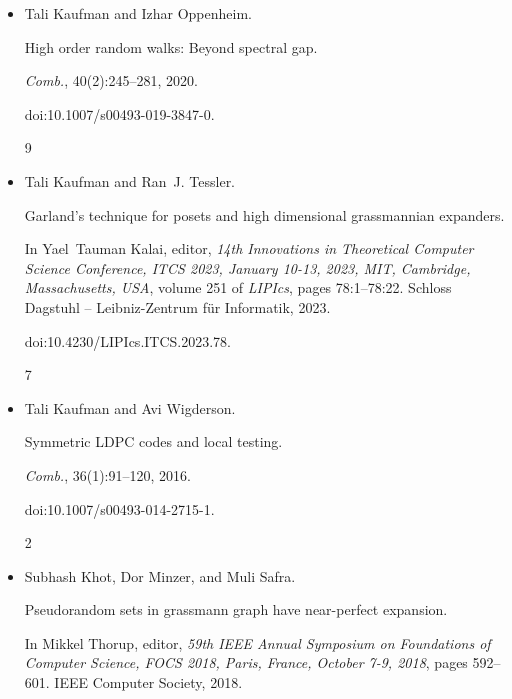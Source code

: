 \documentclass[10pt,a4paper]{article}
\begin{document}
\begin{itemize}
In \emph{Proceedings of the 50th Annual ACM SIGACT Symposium on
Theory of Computing, STOC 2018, Los Angeles, CA, USA, June 25-29, 2018},
pages 773–786, 2018.


doi:10.1145/3188745.3188782.


3, 7, 9, 14, 15




\item[] 
[20]

Tali Kaufman and Izhar Oppenheim.


High order random walks: Beyond spectral gap.


\emph{Comb.}, 40(2):245–281, 2020.


doi:10.1007/s00493-019-3847-0.


9




\item[] 
[21]

Tali Kaufman and Ran J. Tessler.


Garland’s technique for posets and high dimensional grassmannian
expanders.


In Yael Tauman Kalai, editor, \emph{14th Innovations in Theoretical
Computer Science Conference, ITCS 2023, January 10-13, 2023, MIT,
Cambridge, Massachusetts, USA}, volume 251 of \emph{LIPIcs}, pages
78:1–78:22. Schloss Dagstuhl – Leibniz-Zentrum für Informatik, 2023.


doi:10.4230/LIPIcs.ITCS.2023.78.


7




\item[] 
[22]

Tali Kaufman and Avi Wigderson.


Symmetric LDPC codes and local testing.


\emph{Comb.}, 36(1):91–120, 2016.


doi:10.1007/s00493-014-2715-1.


2




\item[] 
[23]

Subhash Khot, Dor Minzer, and Muli Safra.


Pseudorandom sets in grassmann graph have near-perfect expansion.


In Mikkel Thorup, editor, \emph{59th IEEE Annual Symposium on
Foundations of Computer Science, FOCS 2018, Paris, France, October 7-9,
2018}, pages 592–601. IEEE Computer Society, 2018.



\end{itemize}
\end{document}
